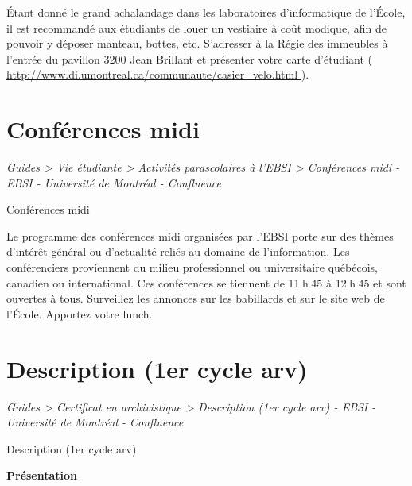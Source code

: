 \documentclass [12 pt]{article}
\begin{document}
            Étant donné le grand achalandage dans les laboratoires d'informatique de l'École, il
                est recommandé aux étudiants de louer un vestiaire à coût modique, afin de pouvoir y
                déposer manteau, bottes, etc.
            S'adresser à la Régie des immeubles à l'entrée du pavillon 3200 Jean Brillant et
                présenter votre carte d'étudiant (
        \href{
        http://www.di.umontreal.ca/communaute/casier_velo.html
        } {
        http://www.di.umontreal.ca/communaute/casier_velo.html
        }
    ).
        
    
    
        \newpage
        \section {
        Conférences midi
        }
        
        
        
        \textit{
        Guides > Vie étudiante > Activités parascolaires à l'EBSI > Conférences
            midi - EBSI - Université de Montréal - Confluence
        }
    
        Conférences midi
        
            Le programme des conférences midi organisées par l'EBSI porte sur des thèmes
                d’intérêt général ou d’actualité reliés au domaine de l’information. Les
                conférenciers proviennent du milieu professionnel ou universitaire québécois,
                canadien ou international. Ces conférences se tiennent de 11 h 45 à 12 h 45 et sont
                ouvertes à tous. Surveillez les annonces sur les babillards et sur le site web de
                l'École. Apportez votre lunch.
        
    
    
        \newpage
        \section {
        Description (1er cycle arv)
        }
        
        
        
        \textit{
        Guides > Certificat en archivistique > Description (1er cycle arv) - EBSI -
            Université de Montréal - Confluence
        }
    
        Description (1er cycle arv)
        
            
        \textbf{
        Présentation
        }
    
\end{document}
